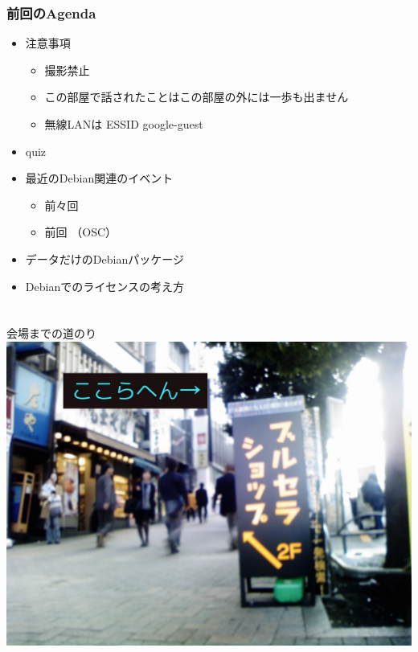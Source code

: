\documentclass[cjk,dvipdfmx,12pt]{beamer}
\begin{document}
\begin{frame}
 \frametitle{前回のAgenda}
\begin{minipage}[t]{0.45\hsize}
  \begin{itemize}
  \item 注意事項
	\begin{itemize}
	 \item 撮影禁止
	 \item この部屋で話されたことはこの部屋の外には一歩も出ません
	 \item 無線LANは ESSID google-guest
	\end{itemize}
  \item quiz
  \item 最近のDebian関連のイベント
	\begin{itemize}
	 \item 前々回
	 \item 前回 （OSC）
	\end{itemize}
 \end{itemize}
\end{minipage} 
\begin{minipage}[t]{0.45\hsize}
 \begin{itemize}
  \item データだけのDebianパッケージ
  \item Debianでのライセンスの考え方
 \end{itemize}
\end{minipage}
\end{frame}

\section{}

\begin{frame}{会場までの道のり}
\includegraphics[width=1\hsize]{image200803/google-entry.jpg}
\end{frame}
\end{document}

